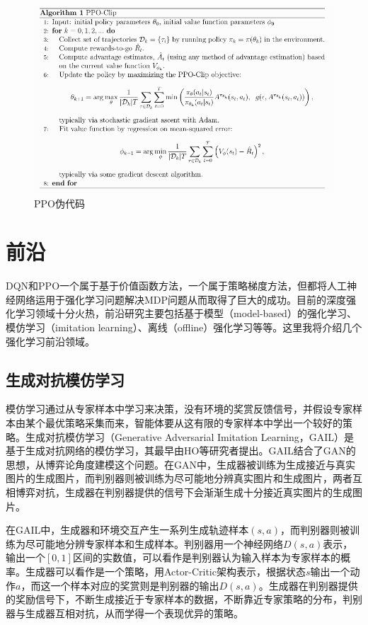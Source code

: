 \documentclass[lang=cn,11pt,a4paper,cite=number]{elegantpaper}
\begin{document}
\begin{figure}
	\centering
	\includegraphics[width=1\linewidth]{figure/fig8}
	\caption{PPO伪代码\cite{schulman2017proximal}}
	\label{fig:fig8}
\end{figure}


\section{前沿}
DQN和PPO一个属于基于价值函数方法，一个属于策略梯度方法，但都将人工神经网络运用于强化学习问题解决MDP问题从而取得了巨大的成功。目前的深度强化学习领域十分火热，前沿研究主要包括基于模型（model-based）的强化学习、模仿学习（imitation learning）、离线（offline）强化学习等等。这里我将介绍几个强化学习前沿领域。
\subsection{生成对抗模仿学习}
模仿学习通过从专家样本中学习来决策，没有环境的奖赏反馈信号，并假设专家样本由某个最优策略采集而来，智能体要从这有限的专家样本中学出一个较好的策略。生成对抗模仿学习（Generative Adversarial Imitation Learning，GAIL）是基于生成对抗网络的模仿学习，其最早由HO等研究者\cite{ho2016generative}提出。GAIL结合了GAN\cite{goodfellow2014generative}的思想，从博弈论角度建模这个问题。在GAN中，生成器被训练为生成接近与真实图片的生成图片，而判别器则被训练为尽可能地分辨真实图片和生成图片，两者互相博弈对抗，生成器在判别器提供的信号下会渐渐生成十分接近真实图片的生成图片。

在GAIL中，生成器和环境交互产生一系列生成轨迹样本$(s,a)$，而判别器则被训练为尽可能地分辨专家样本和生成样本。判别器用一个神经网络$D(s,a)$表示，输出一个$[0,1]$区间的实数值，可以看作是判别器认为输入样本为专家样本的概率。生成器可以看作是一个策略，用Actor-Critic架构表示，根据状态$s$输出一个动作$a$，而这一个样本对应的奖赏则是判别器的输出$D(s,a)$。生成器在判别器提供的奖励信号下，不断生成接近于专家样本的数据，不断靠近专家策略的分布，判别器与生成器互相对抗，从而学得一个表现优异的策略。
\end{document}
